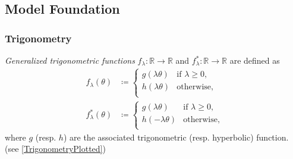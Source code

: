 \documentclass[../methodology.tex]{subfiles}
\begin{document}
\subsection{Model Foundation}
\subsubsection{Trigonometry}
\begin{definition}\label{M:Trigonometry}
    \textit{Generalized trigonometric functions} \(f_\lambda\colon \mathbb{R}\to\mathbb{R}\) and \(f_\lambda^\ast:\mathbb{R}\to\mathbb{R}\) are defined as
    \begin{align*}
        f_\lambda\left(\theta\right)      & \coloneqq
        \begin{cases}
            g\left(\lambda\theta\right) & \text{if \(\lambda\geq0\),} \\
            h\left(\lambda\theta\right) & \text{otherwise,}           \\
        \end{cases} \\
        f_\lambda^\ast\left(\theta\right) & \coloneqq
        \begin{cases}
            g\left(\lambda\theta\right)  & \text{if \(\lambda\geq0\),} \\
            h\left(-\lambda\theta\right) & \text{otherwise,}           \\
        \end{cases}
    \end{align*}
    where \(g\) (resp. \(h\)) are the associated trigonometric (resp. hyperbolic) function.
    (see \cref{TrigonometryPlotted})
\end{definition}
\end{document}
